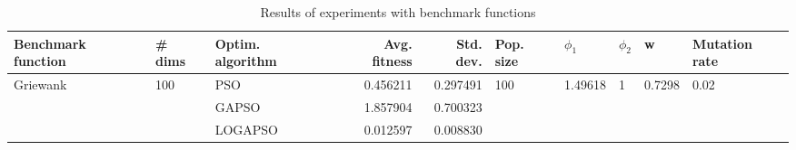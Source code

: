 \begin{table}
\centering
\caption{Results of experiments with benchmark functions}
\begin{tabular}{lllrrlllll}
\toprule
       Benchmark function &              \# dims & Optim. algorithm &  Avg. fitness &  Std. dev. &            Pop. size &               $\phi_{1}$ &         $\phi_{2}$ &                       w &         Mutation rate \\
\midrule
\multirow{3}{*}{Griewank} & \multirow{3}{*}{100} &              PSO &      0.456211 &   0.297491 & \multirow{3}{*}{100} & \multirow{3}{*}{1.49618} & \multirow{3}{*}{1} & \multirow{3}{*}{0.7298} & \multirow{3}{*}{0.02} \\
                          &                      &            GAPSO &      1.857904 &   0.700323 &                      &                          &                    &                         &                       \\
                          &                      &          LOGAPSO &      0.012597 &   0.008830 &                      &                          &                    &                         &                       \\
\bottomrule
\end{tabular}
\end{table}

